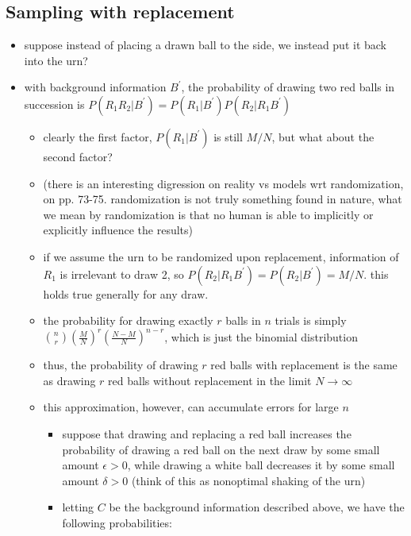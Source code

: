 \documentclass[../jaynes_prob_theory_notes.tex]{subfiles}
\begin{document}
\subsection{Sampling with replacement}
    \begin{itemize}
        \item suppose instead of placing a drawn ball to the side, we instead put it back into the urn?
        \item with background information $B^{\prime}$, the probability of drawing two red balls in succession is $P(R_1R_2|B^{\prime}) = P(R_1|B^{\prime})P(R_2|R_1B^{\prime})$
            \begin{itemize}
                \item clearly the first factor, $P(R_1|B^{\prime})$ is still $M/N$, but what about the second factor?
                \item (there is an interesting digression on reality vs models wrt randomization, on pp. 73-75. randomization is not truly something found in nature, what we mean by randomization is that no human is able to implicitly or explicitly influence the results)
                \item if we assume the urn to be randomized upon replacement, information of $R_1$ is irrelevant to draw 2, so $P(R_2|R_1B^{\prime}) = P(R_2|B^{\prime}) = M/N$. this holds true generally for any draw.
                \item the probability for drawing exactly $r$ balls in $n$ trials is simply $\binom{n}{r}\left(\frac{M}{N}\right)^r\left(\frac{N-M}{N}\right)^{n-r}$, which is just the binomial distribution
                \item thus, the probability of drawing $r$ red balls with replacement is the same as drawing $r$ red balls without replacement in the limit $N \rightarrow \infty$
                \item this approximation, however, can accumulate errors for large $n$
                    \begin{itemize}
                        \item suppose that drawing and replacing a red ball increases the probability of drawing a red ball on the next draw by some small amount $\epsilon > 0$, while drawing a white ball decreases it by some small amount $\delta > 0$ (think of this as nonoptimal shaking of the urn)
                        \item letting $C$ be the background information described above, we have the following probabilities: 
                            \begin{align*}

\end{align*}
\end{itemize}
\end{itemize}
\end{itemize}
\end{document}
